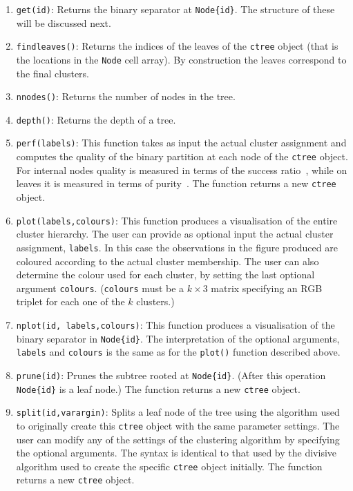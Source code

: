 \documentclass{book}
\begin{document}
\begin{enumerate}

\item {\tt get(id)}: Returns the binary separator at {\tt Node\{id\}}. The structure of these
will be discussed next.

\item {\tt findleaves()}: Returns the indices of the leaves of the {\tt ctree} object (that is the locations in the {\tt Node} cell array). By
construction the leaves correspond to the final clusters.

\item {\tt nnodes()}: Returns the number of nodes in the tree.

\item {\tt depth()}: Returns the depth of a tree.



\item {\tt perf(labels)}: This function takes as input the actual cluster assignment and computes
the quality of the binary partition at each node of the {\tt ctree} object. For internal nodes quality
is measured in terms of the success ratio~\cite{PavlidisHT2016}, while on leaves it is 
measured in terms of purity~\cite{ZhaoK2004}. The function returns a new {\tt ctree} object.

\item {\tt plot(labels,colours)}: This function produces a visualisation of the entire cluster hierarchy. The
user can provide as optional input the actual cluster assignment, {\tt labels}. In this case the observations
in the figure produced are coloured according to the actual cluster membership. The user can also determine the
colour used for each cluster, by setting the last optional argument {\tt colours}. ({\tt colours} must
be a $k \times$3 matrix specifying an RGB triplet for each one of the $k$ clusters.)

\item {\tt nplot(id, labels,colours)}: This function produces a visualisation of the
binary separator in {\tt Node\{id\}}. The interpretation of the optional arguments, {\tt labels} and
{\tt colours} is the same as for the {\tt plot()} function described above.

\item {\tt prune(id)}: Prunes the subtree rooted at {\tt Node\{id\}}. 
(After this operation {\tt Node\{id\}} is a leaf node.) The function returns a new {\tt ctree} object.

\item {\tt split(id,varargin)}: Splits a leaf node of the tree using the algorithm
used to originally create this {\tt ctree} object with the same parameter settings.
The user can modify any of the settings of the clustering algorithm by specifying
the optional arguments. The syntax is identical to that used by the divisive algorithm
used to create the specific {\tt ctree} object initially. The function returns a new {\tt ctree} object.

\end{enumerate}
\end{document}
